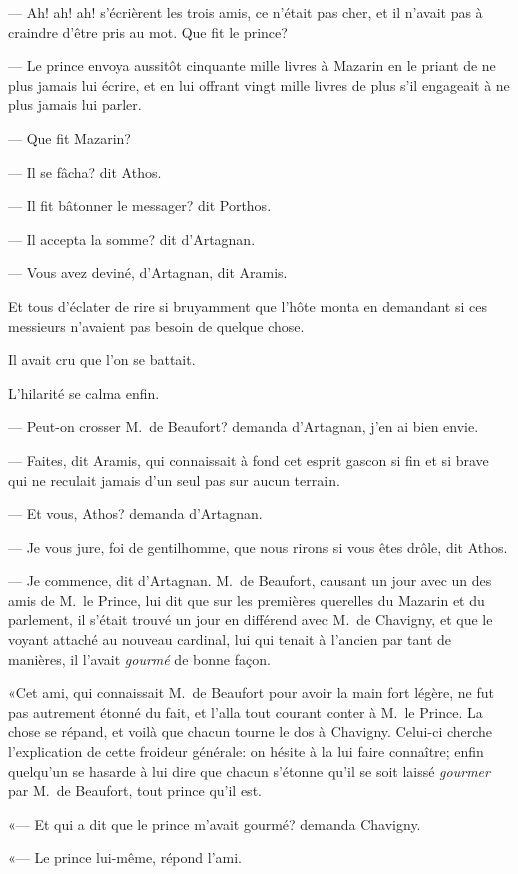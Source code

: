 — Ah! ah! ah! s'écrièrent les trois amis, ce n'était pas cher, et il n'avait pas à craindre d'être pris au mot. Que fit le prince?

— Le prince envoya aussitôt cinquante mille livres à Mazarin en le priant de ne plus jamais lui écrire, et en lui offrant vingt mille livres de plus s'il engageait à ne plus jamais lui parler.

— Que fit Mazarin?

— Il se fâcha? dit Athos.

— Il fit bâtonner le messager? dit Porthos.

— Il accepta la somme? dit d'Artagnan.

— Vous avez deviné, d'Artagnan, dit Aramis.

Et tous d'éclater de rire si bruyamment que l'hôte monta en demandant si ces messieurs n'avaient pas besoin de quelque chose.

Il avait cru que l'on se battait.

L'hilarité se calma enfin.

— Peut-on crosser M.~de Beaufort? demanda d'Artagnan, j'en ai bien envie.

— Faites, dit Aramis, qui connaissait à fond cet esprit gascon si fin et si brave qui ne reculait jamais d'un seul pas sur aucun terrain.

— Et vous, Athos? demanda d'Artagnan.

— Je vous jure, foi de gentilhomme, que nous rirons si vous êtes drôle, dit Athos.

— Je commence, dit d'Artagnan. M.~de Beaufort, causant un jour avec un des amis de M.~le Prince, lui dit que sur les premières querelles du Mazarin et du parlement, il s'était trouvé un jour en différend avec M.~de Chavigny, et que le voyant attaché au nouveau cardinal, lui qui tenait à l'ancien par tant de manières, il l'avait \textit{gourmé} de bonne façon.

«Cet ami, qui connaissait M.~de Beaufort pour avoir la main fort légère, ne fut pas autrement étonné du fait, et l'alla tout courant conter à M.~le Prince. La chose se répand, et voilà que chacun tourne le dos à Chavigny. Celui-ci cherche l'explication de cette froideur générale: on hésite à la lui faire connaître; enfin quelqu'un se hasarde à lui dire que chacun s'étonne qu'il se soit laissé \textit{gourmer} par M.~de Beaufort, tout prince qu'il est.

«— Et qui a dit que le prince m'avait gourmé? demanda Chavigny.

«— Le prince lui-même, répond l'ami.

